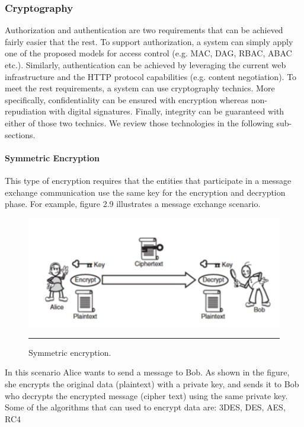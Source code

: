\subsubsection{Cryptography}

Authorization and authentication are two requirements that can be achieved fairly easier that the rest. To support authorization, a system can simply apply one of the proposed models for access control (e.g. MAC\cite{mac}, DAG\cite{dag}, RBAC\cite{rbac}, ABAC\cite{abac} etc.). Similarly, authentication can be achieved by leveraging the current web infrastructure and the HTTP protocol capabilities (e.g. content negotiation). To meet the rest requirements, a system can use cryptography technics. More specifically, confidentiality can be ensured with encryption\cite{cryptography} whereas non-repudiation with digital signatures\cite{digitalSignatures}. Finally, integrity can be guaranteed with either of those two technics. We review those technologies in the following sub-sections.

\paragraph{Symmetric Encryption}

This type of encryption requires that the entities that participate in a message exchange communication use the same key for the encryption and decryption phase. For example, figure 2.9 illustrates a message exchange scenario.

\begin{figure}[htbp]
	\centering
		\includegraphics{./Figures/figure12.pdf}
		\rule{35em}{0.5pt}
	\caption[Symmetric Encryption]{Symmetric encryption\cite{Graham:2001:BWS:559927}.}
	\label{fig:symmetricEncryption}
\end{figure}

In this scenario Alice wants to send a message to Bob. As shown in the figure, she encrypts the original data (plaintext) with a private key, and sends it to Bob who decrypts the encrypted message (cipher text) using the same private key. Some of the algorithms that can used to encrypt data are: 3DES, DES, AES, RC4

